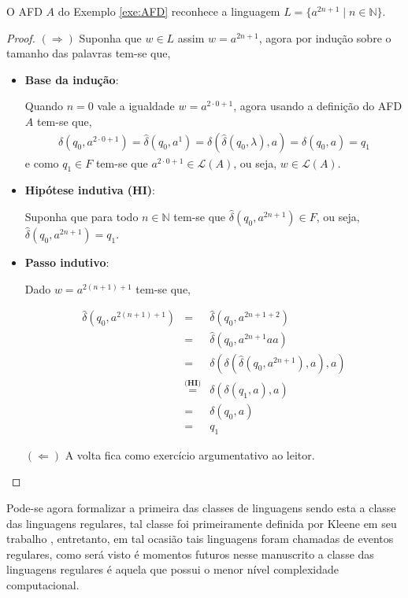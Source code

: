 \begin{exem}
	O AFD $A$ do Exemplo \ref{exe:AFD} reconhece a linguagem $L = \{a^{2n + 1} \mid n \in \mathbb{N}\}$.
	\begin{proof}
		$(\Rightarrow)$ Suponha que $w \in L$ assim $w = a^{2n+1}$, agora por indução sobre o tamanho das palavras tem-se que, 
		
		\begin{itemize}
			\item \textbf{Base da indução}:
			
			Quando $n = 0$ vale a igualdade $w = a^{2\cdot 0+1}$, agora usando a definição do AFD $A$ tem-se que, 
			\begin{eqnarray*}
				\widehat{\delta}(q_0, a^{2\cdot 0+1}) = \widehat{\delta}(q_0, a^{1}) = \delta(\widehat{\delta}(q_0, \lambda), a) = \delta(q_0, a) = q_1
			\end{eqnarray*}
			e como $q_1 \in F$ tem-se que $a^{2\cdot 0+1} \in \mathcal{L}(A)$, ou seja, $w \in \mathcal{L}(A)$.
			
			\item \textbf{Hipótese indutiva (HI)}:
			
			Suponha que para todo $n \in \mathbb{N}$ tem-se que $\widehat{\delta}(q_0, a^{2n+1}) \in F$, ou seja, $\widehat{\delta}(q_0, a^{2n+1}) = q_1$.
			
			\item \textbf{Passo indutivo}:
			
			Dado $w = a^{2(n+1)+1}$ tem-se que,
			
			\begin{eqnarray*}
				\widehat{\delta}(q_0, a^{2(n+1)+1}) & = & \widehat{\delta}(q_0, a^{2n+1+2})\\
				& = & \widehat{\delta}(q_0, a^{2n+1}aa)\\
				& = & \delta(\delta(\widehat{\delta}(q_0, a^{2n+1}), a), a)\\
				& \stackrel{\textbf{(HI)}}{=} & \delta(\delta(q_1, a), a)\\
				& = & \delta(q_0, a)\\
				& = & q_1
			\end{eqnarray*}
		
			$(\Leftarrow)$ A volta fica como exercício argumentativo ao leitor.
		\end{itemize}
	\end{proof}
\end{exem}

Pode-se agora formalizar a primeira das classes de linguagens sendo esta a classe das linguagens regulares, tal classe foi primeiramente definida por Kleene em seu trabalho \cite{kleene1951}, entretanto, em tal ocasião tais linguagens foram chamadas de eventos regulares, como será visto é momentos futuros nesse manuscrito a classe das linguagens regulares é aquela que possui o menor nível complexidade computacional.

